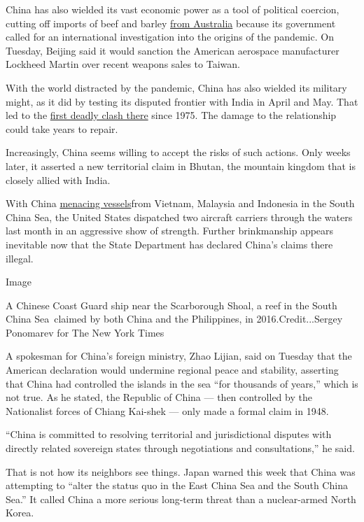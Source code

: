China has also wielded its vast economic power as a tool of political
coercion, cutting off imports of beef and barley
\href{https://www.nytimes.com/2020/06/30/world/australia/cyber-defense-china-hacking.html}{from
Australia} because its government called for an international
investigation into the origins of the pandemic. On Tuesday, Beijing said
it would sanction the American aerospace manufacturer Lockheed Martin
over recent weapons sales to Taiwan.

With the world distracted by the pandemic, China has also wielded its
military might, as it did by testing its disputed frontier with India in
April and May. That led to the
\href{https://www.nytimes.com/2020/06/17/world/asia/china-india-border.html}{first
deadly clash there} since 1975. The damage to the relationship could
take years to repair.

Increasingly, China seems willing to accept the risks of such actions.
Only weeks later, it asserted a new territorial claim in Bhutan, the
mountain kingdom that is closely allied with India.

With China
\href{https://www.nytimes.com/2020/05/24/world/asia/china-hong-kong-taiwan.html}{menacing
vessels}from Vietnam, Malaysia and Indonesia in the South China Sea, the
United States dispatched two aircraft carriers through the waters last
month in an aggressive show of strength. Further brinkmanship appears
inevitable now that the State Department has declared China's claims
there illegal.

Image

A Chinese Coast Guard ship near the Scarborough Shoal, a reef in the
South China Sea~claimed by both China and the Philippines, in
2016.Credit...Sergey Ponomarev for The New York Times

A spokesman for China's foreign ministry, Zhao Lijian, said on Tuesday
that the American declaration would undermine regional peace and
stability, asserting that China had controlled the islands in the sea
``for thousands of years,'' which is not true. As he stated, the
Republic of China --- then controlled by the Nationalist forces of
Chiang Kai-shek --- only made a formal claim in 1948.

``China is committed to resolving territorial and jurisdictional
disputes with directly related sovereign states through negotiations and
consultations,'' he said.

That is not how its neighbors see things. Japan warned this week that
China was attempting to ``alter the status quo in the East China Sea and
the South China Sea.'' It called China a more serious long-term threat
than a nuclear-armed North Korea.

